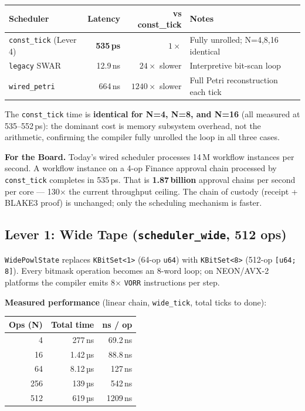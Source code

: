 \documentclass[12pt,a4paper]{article}
\theoremstyle{definition}
\theoremstyle{remark}
\newcommand{\auditinsight}[2]{%
  \begin{auditbox}
    \textbf{\color{warnorange}#1}\quad #2
  \end{auditbox}}
\begin{document}
\begin{center}
\renewcommand{\arraystretch}{1.12}
\begin{tabular}{lrrl}
\toprule
\textbf{Scheduler} & \textbf{Latency} & \textbf{vs const\_tick} & \textbf{Notes} \\
\midrule
\texttt{const\_tick} (Lever 4)  & \textbf{535\,ps}  & $1\times$       & Fully unrolled; N=4,8,16 identical \\
\texttt{legacy} SWAR            & 12.9\,ns          & $24\times$ slower & Interpretive bit-scan loop \\
\texttt{wired\_petri}           & 664\,ns           & $1240\times$ slower & Full Petri reconstruction each tick \\
\bottomrule
\end{tabular}
\end{center}

The \texttt{const\_tick} time is \textbf{identical for N=4, N=8, and N=16}
(all measured at 535--552\,ps): the dominant cost is memory subsystem overhead,
not the arithmetic, confirming the compiler fully unrolled the loop in all three cases.

\auditinsight{For the Board.}{%
Today's wired scheduler processes 14\,M workflow instances per second.
A workflow instance on a 4-op Finance approval chain processed by
\texttt{const\_tick} completes in 535\,ps.
That is \textbf{1.87\,billion} approval chains per second per core ---
130$\times$ the current throughput ceiling.
The chain of custody (receipt + BLAKE3 proof) is unchanged; only the scheduling
mechanism is faster.}

\subsection{Lever 1: Wide Tape (\texttt{scheduler\_wide}, 512 ops)}

\texttt{WidePowlState} replaces \texttt{KBitSet<1>} (64-op \texttt{u64}) with
\texttt{KBitSet<8>} (512-op \texttt{[u64;\,8]}).
Every bitmask operation becomes an 8-word loop; on NEON/AVX-2 platforms the
compiler emits 8$\times$ \texttt{VORR} instructions per step.

\textbf{Measured performance} (linear chain, \texttt{wide\_tick}, total ticks to done):

\begin{center}
\renewcommand{\arraystretch}{1.12}
\begin{tabular}{rrr}
\toprule
\textbf{Ops (N)} & \textbf{Total time} & \textbf{ns / op} \\
\midrule
4   & 277\,ns  & 69.2\,ns \\
16  & 1.42\,µs & 88.8\,ns \\
64  & 8.12\,µs & 127\,ns  \\
256 & 139\,µs  & 542\,ns  \\
512 & 619\,µs  & 1209\,ns \\
\bottomrule
\end{tabular}
\end{center}
\end{document}
